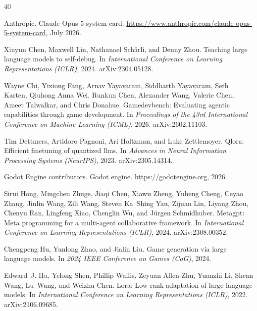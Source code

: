 \begin{thebibliography}{40}
\small
\setlength{\itemsep}{2pt}

Anthropic.
\newblock Claude Opus 5 system card.
\newblock \url{https://www.anthropic.com/claude-opus-5-system-card}, July 2026.

Xinyun Chen, Maxwell Lin, Nathanael Schärli, and Denny Zhou.
\newblock Teaching large language models to self-debug.
\newblock In \emph{International Conference on Learning Representations (ICLR)}, 2024. arXiv:2304.05128.

Wayne Chi, Yixiong Fang, Arnav Yayavaram, Siddharth Yayavaram, Seth Karten, Qiuhong Anna Wei, Runkun Chen, Alexander Wang, Valerie Chen, Ameet Talwalkar, and Chris Donahue.
\newblock Gamedevbench: Evaluating agentic capabilities through game development.
\newblock In \emph{Proceedings of the 43rd International Conference on Machine Learning (ICML)}, 2026. arXiv:2602.11103.

Tim Dettmers, Artidoro Pagnoni, Ari Holtzman, and Luke Zettlemoyer.
\newblock Qlora: Efficient finetuning of quantized llms.
\newblock In \emph{Advances in Neural Information Processing Systems (NeurIPS)}, 2023. arXiv:2305.14314.

Godot Engine contributors.
\newblock Godot engine.
\newblock \url{https://godotengine.org}, 2026.

Sirui Hong, Mingchen Zhuge, Jiaqi Chen, Xiawu Zheng, Yuheng Cheng, Ceyao Zhang, Jinlin Wang, Zili Wang, Steven Ka~Shing Yau, Zijuan Lin, Liyang Zhou, Chenyu Ran, Lingfeng Xiao, Chenglin Wu, and Jürgen Schmidhuber.
\newblock Metagpt: Meta programming for a multi-agent collaborative framework.
\newblock In \emph{International Conference on Learning Representations (ICLR)}, 2024. arXiv:2308.00352.

Chengpeng Hu, Yunlong Zhao, and Jialin Liu.
\newblock Game generation via large language models.
\newblock In \emph{2024 IEEE Conference on Games (CoG)}, 2024.

Edward~J. Hu, Yelong Shen, Phillip Wallis, Zeyuan Allen-Zhu, Yuanzhi Li, Shean Wang, Lu~Wang, and Weizhu Chen.
\newblock Lora: Low-rank adaptation of large language models.
\newblock In \emph{International Conference on Learning Representations (ICLR)}, 2022. arXiv:2106.09685.


\end{thebibliography}
